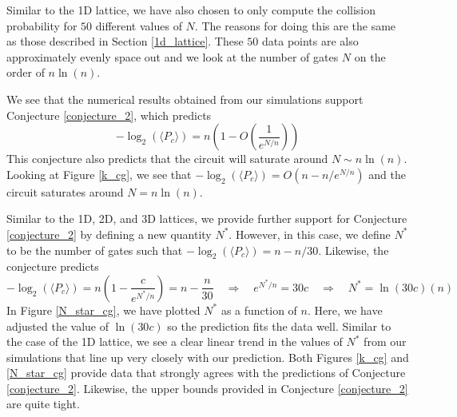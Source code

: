 \documentclass[11pt]{article}
\theoremstyle{definition}
\theoremstyle{plain}
\begin{document}
Similar to the 1D lattice, we have also chosen to only compute the collision probability for $50$ different values of $N$. The reasons for doing this are the same as those described in Section {\ref{1d_lattice}}. These $50$ data points are also approximately evenly space out and we look at the number of gates $N$ on the order of $n \ln(n)$.

We see that the numerical results obtained from our simulations support Conjecture {\ref{conjecture_2}}, which predicts
\begin{equation}
-\log_2(\langle P_c \rangle) = n \left( 1 - O\left(\frac{1}{e^{N/n}} \right) \right) 
\end{equation}
This conjecture also predicts that the circuit will saturate around $N \sim n \ln(n)$. Looking at Figure {\ref{k_cg}}, we see that $-\log_2(\langle P_c \rangle)= O(n - n / e^{N/n})$ and the circuit saturates around $N = n \ln(n)$.

Similar to the 1D, 2D, and 3D lattices, we provide further support for Conjecture {\ref{conjecture_2}} by defining a new quantity $N^*$. However, in this case, we define $N^*$ to be the number of gates such that $-\log_2(\langle P_c \rangle)= n - n/30$. Likewise, the conjecture predicts
\begin{equation}
  -\log_2(\langle P_c \rangle)= n \left( 1 - \frac{c}{e^{N^*/n}} \right)
  = n - \frac{n}{30}
  \quad \Rightarrow \quad
  e^{N^*/n} = 30c
  \quad \Rightarrow \quad
  N^* = \ln(30c) (n)  
\end{equation}
In Figure {\ref{N_star_cg}}, we have plotted $N^*$ as a function of $n$. Here, we have adjusted the value of $\ln(30c)$ so the prediction fits the data well. Similar to the case of the 1D lattice, we see a clear linear trend in the values of $N^*$ from our simulations that line up very closely with our prediction. Both Figures {\ref{k_cg}} and {\ref{N_star_cg}} provide data that strongly agrees with the predictions of Conjecture {\ref{conjecture_2}}. Likewise, the upper bounds provided in Conjecture {\ref{conjecture_2}} are quite tight. 
\end{document}
